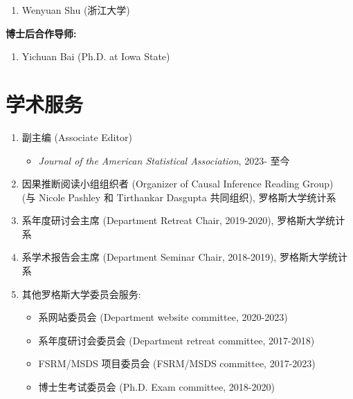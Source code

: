 \documentclass[margin, line]{res}
\begin{document}
\begin{resume}
\begin{enumerate}
            \item Wenyuan Shu (浙江大学)
        \end{enumerate}

        {\bf 博士后合作导师:}
        \vspace{2mm}
        \begin{enumerate}
            \item Yichuan Bai (Ph.D. at Iowa State)
        \end{enumerate}

		\section{\sc 学术服务}

        \begin{enumerate}
            \item 副主编 (Associate Editor)
                \begin{itemize}
                    \item {\it Journal of the American Statistical Association}, 2023- 至今
                \end{itemize}

            \item 因果推断阅读小组组织者 (Organizer of Causal Inference Reading Group) \\ 
                (与 Nicole Pashley 和 Tirthankar Dasgupta 共同组织), 罗格斯大学统计系

            \item 系年度研讨会主席 (Department Retreat Chair, 2019-2020), 罗格斯大学统计系

            \item 系学术报告会主席 (Department Seminar Chair, 2018-2019), 罗格斯大学统计系

            \item 其他罗格斯大学委员会服务:
                \begin{itemize}
                    \item 系网站委员会 (Department website committee, 2020-2023)

                    \item 系年度研讨会委员会 (Department retreat committee, 2017-2018)

                    \item FSRM/MSDS 项目委员会 (FSRM/MSDS committee, 2017-2023)

                    \item 博士生考试委员会 (Ph.D. Exam committee, 2018-2020)


\end{itemize}
\end{enumerate}
\end{resume}
\end{document}
